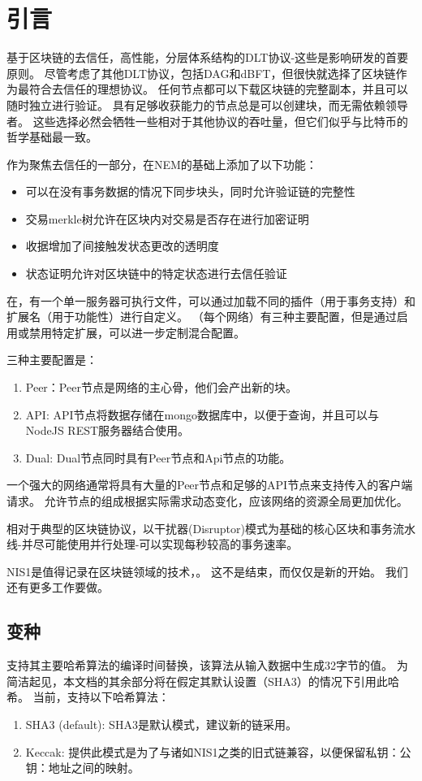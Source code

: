 \section{引言}
\label{sec:introduction}


基于区块链的去信任，高性能，分层体系结构的DLT协议-这些是影响\codename 研发的首要原则。
尽管考虑了其他DLT协议，包括DAG和dBFT，但很快就选择了区块链作为最符合去信任的理想协议。
任何节点都可以下载区块链的完整副本，并且可以随时独立进行验证。
具有足够收获能力的节点总是可以创建块，而无需依赖领导者。
这些选择必然会牺牲一些相对于其他协议的吞吐量，但它们似乎与比特币的哲学基础最一致。

作为聚焦去信任的一部分，在NEM的基础上添加了以下功能：
\begin{itemize}
    \item{可以在没有事务数据的情况下同步块头，同时允许验证链的完整性}
    \item{交易merkle树允许在区块内对交易是否存在进行加密证明}
    \item{收据增加了间接触发状态更改的透明度}
    \item{状态证明允许对区块链中的特定状态进行去信任验证}
\end{itemize}


在，有一个单一服务器可执行文件，可以通过加载不同的插件（用于事务支持）和扩展名（用于功能性）进行自定义。
（每个网络）有三种主要配置，但是通过启用或禁用特定扩展，可以进一步定制混合配置。

三种主要配置是：
\begin{enumerate}
\item Peer：Peer节点是网络的主心骨，他们会产出新的块。
\item API: API节点将数据存储在mongo数据库中，以便于查询，并且可以与NodeJS REST服务器结合使用。
\item Dual: Dual节点同时具有Peer节点和Api节点的功能。
\end{enumerate}


一个强大的网络通常将具有大量的Peer节点和足够的API节点来支持传入的客户端请求。
允许节点的组成根据实际需求动态变化，应该网络的资源全局更加优化。

相对于典型的区块链协议，以干扰器(Disruptor)模式为基础的核心区块和事务流水线-并尽可能使用并行处理-可以实现每秒较高的事务速率。


NIS1是值得记录在区块链领域的技术，。
这不是结束，而仅仅是新的开始。
我们还有更多工作要做。

\subsection{变种}

\codenamespace 支持其主要哈希算法的编译时间替换，该算法从输入数据中生成32字节的值。
为简洁起见，本文档的其余部分将在假定其默认设置（SHA3）的情况下引用此哈希。
当前，支持以下哈希算法：

\begin{enumerate}
    \item{SHA3 (default): SHA3是默认模式，建议新的链采用。}
    \item{Keccak: 提供此模式是为了与诸如NIS1之类的旧式链兼容，以便保留私钥：公钥：地址之间的映射。}
\end{enumerate}

